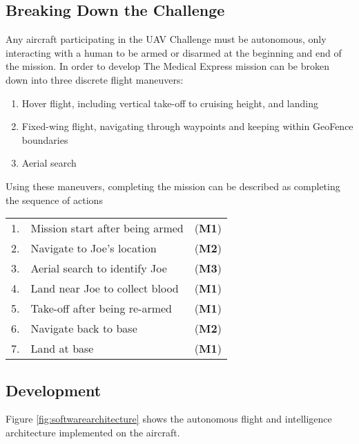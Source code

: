 \subsection{Breaking Down the Challenge}
\label{sec:flight}
Any aircraft participating in the UAV Challenge must be autonomous, only interacting with a human to be armed or disarmed at the beginning and end of the mission. In order to develop 
The Medical Express mission can be broken down into three discrete flight maneuvers:
\begin{enumerate}[label=\bfseries M\arabic*:] \itemsep-2pt
	\item Hover flight, including vertical take-off to cruising height, and landing
	\item Fixed-wing flight, navigating through waypoints and keeping within GeoFence boundaries
	\item Aerial search
\end{enumerate}

Using these maneuvers, completing the mission can be described as completing the sequence of actions\\
\begin{tabular}{r l l}
	1. & Mission start after being armed & (\textbf{M1}) \\ 
	2. & Navigate to Joe's location & (\textbf{M2}) \\ 
	3. & Aerial search to identify Joe & (\textbf{M3}) \\ 
	4. & Land near Joe to collect blood & (\textbf{M1}) \\ 
	5. & Take-off after being re-armed & (\textbf{M1}) \\ 
	6. & Navigate back to base & (\textbf{M2}) \\ 
	7. & Land at base & (\textbf{M1}) \\ 
\end{tabular} 

\subsection{Development}
Figure \ref{fig:softwarearchitecture} shows the autonomous flight and intelligence architecture implemented on the aircraft.


